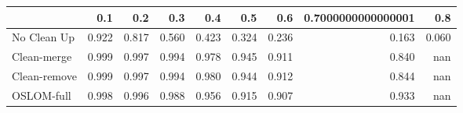 \begin{tabular}{lrrrrrrrr}
\toprule
{} &   0.1 &   0.2 &   0.3 &   0.4 &   0.5 &   0.6 & 0.7000000000000001 &   0.8 \\
\midrule
No Clean Up  & 0.922 & 0.817 & 0.560 & 0.423 & 0.324 & 0.236 &              0.163 & 0.060 \\
Clean-merge  & 0.999 & 0.997 & 0.994 & 0.978 & 0.945 & 0.911 &              0.840 &   nan \\
Clean-remove & 0.999 & 0.997 & 0.994 & 0.980 & 0.944 & 0.912 &              0.844 &   nan \\
OSLOM-full   & 0.998 & 0.996 & 0.988 & 0.956 & 0.915 & 0.907 &              0.933 &   nan \\
\bottomrule
\end{tabular}
